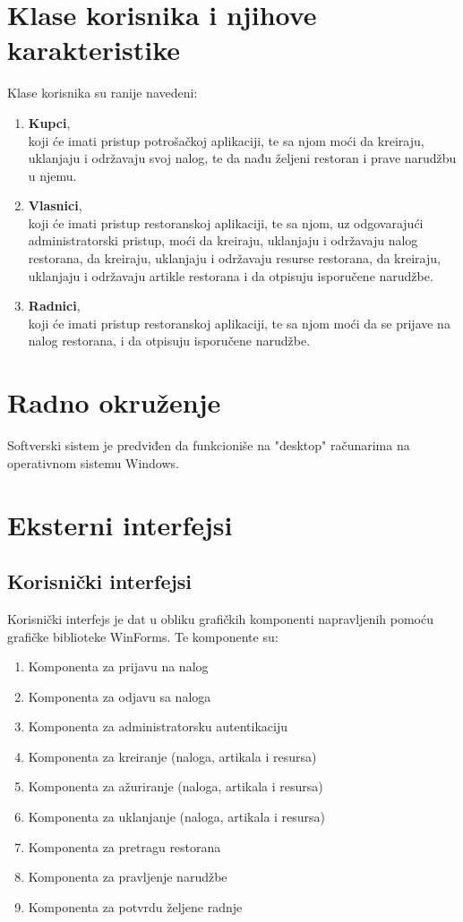 \documentclass{scrreprt}
\begin{document}
\section{Klase korisnika i njihove karakteristike}
Klase korisnika su ranije navedeni:

\begin{enumerate}
	\itemsep0em
	\item \textbf{Kupci},\\
		koji će imati pristup potrošačkoj aplikaciji, te sa njom moći
		da kreiraju, uklanjaju i održavaju svoj nalog, te da
		nađu željeni restoran i prave narudžbu u njemu.
	\item \textbf{Vlasnici},\\
		koji će imati pristup restoranskoj aplikaciji, te sa njom,
		uz odgovarajući administratorski pristup, moći
		da kreiraju, uklanjaju i održavaju nalog restorana,
		da kreiraju, uklanjaju i održavaju resurse restorana,
		da kreiraju, uklanjaju i održavaju artikle restorana
		i da otpisuju isporučene narudžbe.
	\item \textbf{Radnici},\\
		koji će imati pristup restoranskoj aplikaciji, te sa njom moći
		da se prijave na nalog restorana,
		i da otpisuju isporučene narudžbe.
\end{enumerate}

\section{Radno okruženje}
Softverski sistem je predviđen da funkcioniše na "desktop" računarima
na operativnom sistemu Windows.

\section{Eksterni interfejsi}

\subsection{Korisnički interfejsi}

Korisnički interfejs je dat u obliku grafičkih komponenti napravljenih pomoću
grafičke biblioteke WinForms. Te komponente su:

\begin{enumerate}
	\itemsep0em
	\item Komponenta za prijavu na nalog
	\item Komponenta za odjavu sa naloga
	\item Komponenta za administratorsku autentikaciju
	\item Komponenta za kreiranje (naloga, artikala i resursa)
	\item Komponenta za ažuriranje (naloga, artikala i resursa)
	\item Komponenta za uklanjanje (naloga, artikala i resursa)
	\item Komponenta za pretragu restorana
	\item Komponenta za pravljenje narudžbe
	\item Komponenta za potvrdu željene radnje
\end{enumerate}
\end{document}
